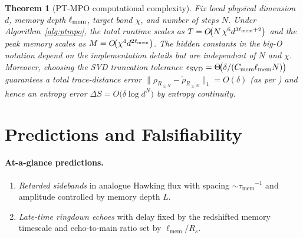 \documentclass[a4paper,11pt]{article}
\newcommand{\ellmem}{\ensuremath{\ell_{\mathrm{mem}}}}
\newcommand{\taumem}{\ensuremath{\tau_{\mathrm{mem}}}}
\theoremstyle{plain}
\newtheorem{theorem}{Theorem}
\theoremstyle{definition}
\theoremstyle{remark}
\begin{document}
\begin{theorem}[PT-MPO computational complexity]\label{thm:ptmpo-complexity}
Fix local physical dimension $d$, memory depth $\ell_{\rm mem}$, target bond $\chi$, and number of steps $N$. Under Algorithm~\ref{alg:ptmpo}, the total runtime scales as $T=O\!\big(N\,\chi^6 d^{3\ell_{\rm mem}+2}\big)$ and the peak memory scales as $M=O\!\big(\chi^4 d^{2\ell_{\rm mem}}\big)$. The hidden constants in the big-O notation depend on the implementation details but are independent of $N$ and $\chi$. Moreover, choosing the SVD truncation tolerance $\epsilon_{\rm SVD}=\Theta\!\big(\delta/(C_{\rm mem}\ell_{\rm mem} N)\big)$ guarantees a total trace-distance error $\|\rho_{R_{\le N}}-\tilde\rho_{R_{\le N}}\|_1=O(\delta)$ (as per ) and hence an entropy error $\Delta S=O\!\big(\delta\log d^N\big)$ by entropy continuity. 
\end{theorem}

\section{Predictions and Falsifiability}
\label{sec:predictions}

\paragraph{At-a-glance predictions.}
\begin{enumerate}
  \item \emph{Retarded sidebands} in analogue Hawking flux with spacing \(\sim \taumem^{-1}\) and amplitude controlled by memory depth \(L\).
  \item \emph{Late-time ringdown echoes} with delay fixed by the redshifted memory timescale and echo-to-main ratio set by \(\ellmem/R_s\).
\end{enumerate}
\end{document}
